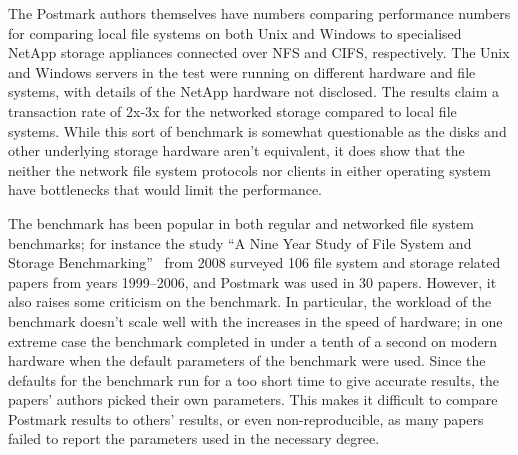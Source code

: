 The Postmark authors themselves have numbers comparing performance numbers for comparing local file systems on both Unix and Windows
to specialised NetApp storage appliances connected over NFS and CIFS, respectively.
The Unix and Windows servers in the test were running on different hardware and file systems,
with details of the NetApp hardware not disclosed.
The results claim a transaction rate of 2x-3x for the networked storage compared to local file systems.
While this sort of benchmark is somewhat questionable as the disks and other underlying storage hardware aren't equivalent,
it does show that the neither the network file system protocols nor clients in either operating system have
bottlenecks that would limit the performance.

The benchmark has been popular in both regular and networked file system benchmarks;
for instance the study ``A Nine Year Study of File System and Storage Benchmarking''~\cite{MetaStudy} from 2008
surveyed 106 file system and storage related papers from years 1999--2006, and Postmark was used in 30 papers.
However, it also raises some criticism on the benchmark.
In particular, the workload of the benchmark doesn't scale well with the increases in the speed of hardware;
in one extreme case the benchmark completed in under a tenth of a second on modern hardware when the default parameters
of the benchmark were used.
Since the defaults for the benchmark run for a too short time to give accurate results,
the papers' authors picked their own parameters.
This makes it difficult to compare Postmark results to others' results,
or even non-reproducible, as many papers failed to report the parameters used in the necessary degree.

